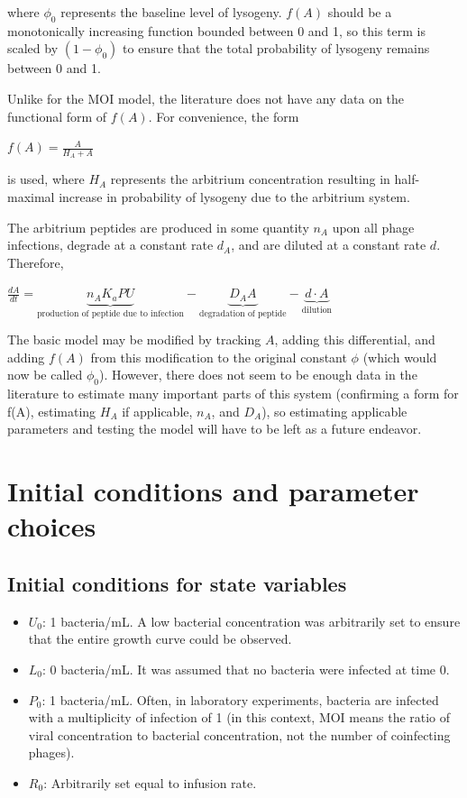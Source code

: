 \documentclass{article}
\begin{document}
where $\phi_0$ represents the baseline level of lysogeny. $f(A)$ should be a monotonically increasing function bounded between 0 and 1, so this term is scaled by $(1-\phi_0)$ to ensure that the total probability of lysogeny remains between 0 and 1.

Unlike for the MOI model, the literature does not have any data on the functional form of $f(A)$. For convenience, the form

\begin{center}
$f(A) = \frac{A}{H_A+A}$
\end{center}

is used, where $H_A$ represents the arbitrium concentration resulting in half-maximal increase in probability of lysogeny due to the arbitrium system.

The arbitrium peptides are produced in some quantity $n_A$ upon all phage infections, degrade at a constant rate $d_A$, and are diluted at a constant rate $d$. Therefore, 
\begin{center}
$\frac{dA}{dt} = \underbrace{n_AK_aPU}_{\text{production of peptide due to infection}}-\underbrace{D_AA}_{\text{degradation of peptide}}-\underbrace{d \cdot A}_{\text{dilution}}$
\end{center}

The basic model may be modified by tracking $A$, adding this differential, and adding $f(A)$ from this modification to the original constant $\phi$ (which would now be called $\phi_0$). However, there does not seem to be enough data in the literature to estimate many important parts of this system (confirming a form for f(A), estimating $H_A$ if applicable, $n_A$, and $D_A$), so estimating applicable parameters and testing the model will have to be left as a future endeavor. 

\section{Initial conditions and parameter choices}

\subsection{Initial conditions for state variables}
\begin{itemize}
\item $U_0$: 1 bacteria/mL. A low bacterial concentration was arbitrarily set to ensure that the entire growth curve could be observed.
\item $L_0$: 0 bacteria/mL. It was assumed that no bacteria were infected at time 0.
\item $P_0$: 1 bacteria/mL. Often, in laboratory experiments, bacteria are infected with a multiplicity of infection of 1 (in this context, MOI means the ratio of viral concentration to bacterial concentration, not the number of coinfecting phages). 
\item $R_0$: Arbitrarily set equal to infusion rate. 
\end{itemize}
\end{document}
